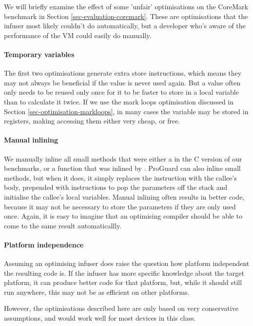 We will briefly examine the effect of some 'unfair' optimisations on the CoreMark benchmark in Section \ref{sec-evaluation-coremark}. These are optimisations that the infuser most likely couldn't do automatically, but a developer who's aware of the performance of the VM could easily do manually.

\paragraph{Temporary variables}
The first two optimisations generate extra store instructions, which means they may not always be beneficial if the value is never used again. But a value often only needs to be reused only once for it to be faster to store in a local variable than to calculate it twice. If we use the mark loops optimisation discussed in Section \ref{sec-optimisation-markloops}, in many cases the variable may be stored in registers, making accessing them either very cheap, or free.

\paragraph{Manual inlining}
We manually inline all small methods that were either a  in the C version of our benchmarks, or a function that was inlined by . ProGuard can also inline small methods, but when it does, it simply replaces the  instruction with the callee's body, prepended with  instructions to pop the parameters off the stack and initialise the callee's local variables. Manual inlining often results in better code, because it may not be necessary to store the parameters if they are only used once. Again, it is easy to imagine that an optimising compiler should be able to come to the same result automaticallly.

\paragraph{Platform independence}
Assuming an optimising infuser does raise the question how platform independent the resulting code is. If the infuser has more specific knowledge about the target platform, it can produce better code for that platform, but, while it should still run anywhere, this may not be as efficient on other platforms.

However, the optimisations described here are only based on very conservative assumptions, and would work well for most devices in this class.

